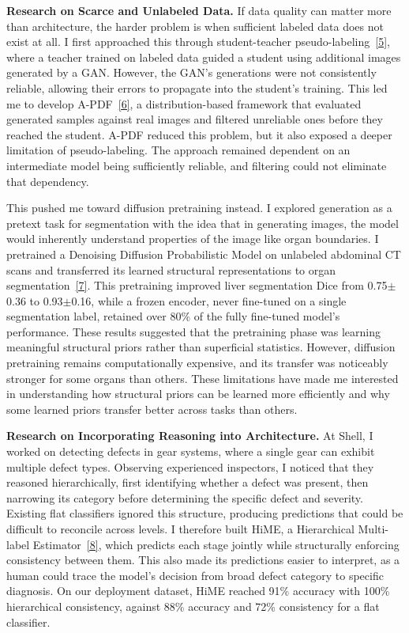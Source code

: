 \documentclass[12pt]{article}
\begin{document}
\vspace{8pt}

\textbf{Research on Scarce and Unlabeled Data.} If data quality can matter more than architecture, the harder problem is when sufficient labeled data does not exist at all. I first approached this through student-teacher pseudo-labeling~\hyperref[ref5]{[5]}, where a teacher trained on labeled data guided a student using additional images generated by a GAN. However, the GAN's generations were not consistently reliable, allowing their errors to propagate into the student's training. This led me to develop A-PDF~\hyperref[ref6]{[6]}, a distribution-based framework that evaluated generated samples against real images and filtered unreliable ones before they reached the student. A-PDF reduced this problem, but it also exposed a deeper limitation of pseudo-labeling. The approach remained dependent on an intermediate model being sufficiently reliable, and filtering could not eliminate that dependency.

This pushed me toward diffusion pretraining instead. I explored generation as a pretext task for segmentation with the idea that in generating images, the model would inherently understand properties of the image like organ boundaries. I pretrained a Denoising Diffusion Probabilistic Model on unlabeled abdominal CT scans and transferred its learned structural representations to organ segmentation~\hyperref[ref7]{[7]}. This pretraining improved liver segmentation Dice from 0.75$\pm$0.36 to 0.93$\pm$0.16, while a frozen encoder, never fine-tuned on a single segmentation label, retained over 80\% of the fully fine-tuned model's performance. These results suggested that the pretraining phase was learning meaningful structural priors rather than superficial statistics. However, diffusion pretraining remains computationally expensive, and its transfer was noticeably stronger for some organs than others. These limitations have made me interested in understanding how structural priors can be learned more efficiently and why some learned priors transfer better across tasks than others.



\vspace{8pt}

\textbf{Research on Incorporating Reasoning into Architecture.} At Shell, I worked on detecting defects in gear systems, where a single gear can exhibit multiple defect types. Observing experienced inspectors, I noticed that they reasoned hierarchically, first identifying whether a defect was present, then narrowing its category before determining the specific defect and severity. Existing flat classifiers ignored this structure, producing predictions that could be difficult to reconcile across levels. I therefore built HiME, a Hierarchical Multi-label Estimator~\hyperref[ref8]{[8]}, which predicts each stage jointly while structurally enforcing consistency between them. This also made its predictions easier to interpret, as a human could trace the model's decision from broad defect category to specific diagnosis. On our deployment dataset, HiME reached 91\% accuracy with 100\% hierarchical consistency, against 88\% accuracy and 72\% consistency for a flat classifier.
\end{document}
